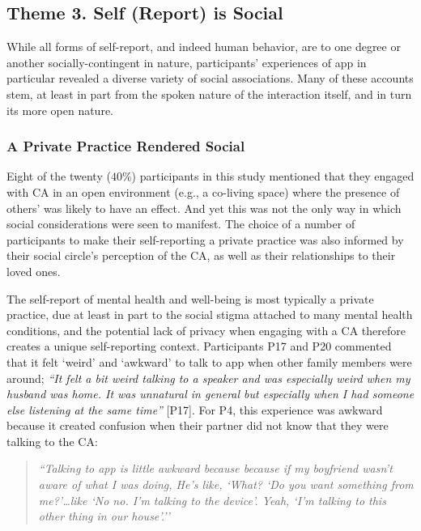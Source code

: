     \subsection{Theme 3. Self (Report) is Social}
    
        While all forms of self-report, and indeed human behavior, are to one degree or another socially-contingent in nature, participants' experiences of \acl{app} in particular revealed a diverse variety of social associations. Many of these accounts stem, at least in part from the spoken nature of the interaction itself, and in turn its more open nature.

        \subsubsection{A Private Practice Rendered Social} %
            
            Eight of the twenty ($40\%$) participants in this study mentioned that they engaged with \ac{CA} in an open environment (e.g., a co-living space) where the presence of others' was likely to have an effect. And yet this was not the only way in which social considerations were seen to manifest. The choice of a number of participants to make their self-reporting a private practice was also informed by their social circle's perception of the \ac{CA}, as well as their relationships to their loved ones.
            
            The self-report of mental health and well-being is most typically a private practice, due at least in part to the social stigma attached to many mental health conditions, and the potential lack of privacy when engaging with a \ac{CA} therefore creates a unique self-reporting context. Participants P17 and P20 commented that it felt `weird' and `awkward' to talk to \acl{app} when other family members were around; \textit{``It felt a bit weird talking to a speaker and was especially weird when my husband was home. It was unnatural in general but especially when I had someone else listening at the same time''} [P17]. For P4, this experience was awkward because it created confusion when their partner did not know that they were talking to the \ac{CA}:
            
                \begin{quote}
                \vspace{2mm}
                    \textit{``Talking to \acl{app} is little awkward because because if my boyfriend wasn't aware of what I was doing, He's like, `What? `Do you want something from me?'\ldots like `No no. I'm talking to the device'. Yeah, `I'm talking to this other thing in our house'.''} %
                \vspace{2mm}
                \end{quote} 
            
